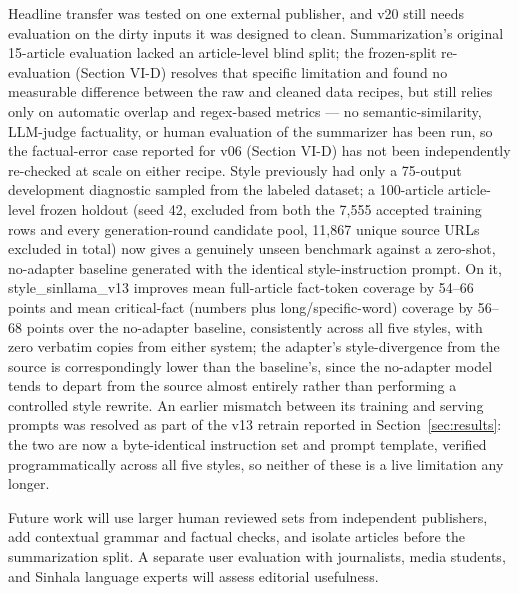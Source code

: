 \documentclass[a4paper,conference]{IEEEtran}
\begin{document}
Headline transfer was tested on one external publisher, and v20 still needs
evaluation on the dirty inputs it was designed to clean. Summarization's
original 15-article evaluation lacked an article-level blind split; the
frozen-split re-evaluation (Section VI-D) resolves that specific limitation
and found no measurable difference between the raw and cleaned data recipes,
but still relies only on automatic overlap and regex-based metrics — no
semantic-similarity, LLM-judge factuality, or human evaluation of the
summarizer has been run, so the factual-error case reported for v06
(Section VI-D) has not been independently re-checked at scale on either
recipe. Style previously had only a 75-output development diagnostic sampled
from the labeled dataset; a 100-article article-level frozen holdout (seed
42, excluded from both the 7,555 accepted training rows and every
generation-round candidate pool, 11,867 unique source URLs excluded in
total) now gives a genuinely unseen benchmark against a zero-shot, no-adapter
baseline generated with the identical style-instruction prompt. On it,
style\_sinllama\_v13 improves mean full-article fact-token coverage by
54--66 points and mean critical-fact (numbers plus long/specific-word)
coverage by 56--68 points over the no-adapter baseline, consistently across
all five styles, with zero verbatim copies from either system; the
adapter's style-divergence from the source is correspondingly lower than the
baseline's, since the no-adapter model tends to depart from the source
almost entirely rather than performing a controlled style rewrite. An
earlier mismatch between its training and serving prompts was resolved as
part of the v13 retrain reported in Section~\ref{sec:results}: the two are
now a byte-identical instruction set and prompt template, verified
programmatically across all five styles, so neither of these is a live
limitation any longer.

Future work will use larger human reviewed sets from independent publishers,
add contextual grammar and factual checks, and isolate articles before the
summarization split. A separate user evaluation with journalists, media
students, and Sinhala language experts will assess editorial usefulness.

\balance
\end{document}
